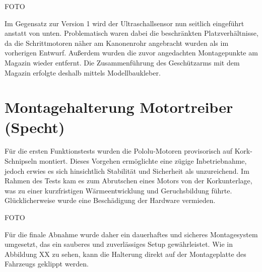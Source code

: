 FOTO

Im Gegensatz zur Version 1 wird der Ultraschallsensor nun seitlich eingeführt anstatt von unten. Problematisch waren dabei die beschränkten Platzverhältnisse, da die Schrittmotoren näher am Kanonenrohr angebracht wurden als im vorherigen Entwurf. Außerdem wurden die zuvor angedachten Montagepunkte am Magazin wieder entfernt. Die Zusammenführung des Geschützarms mit dem Magazin erfolgte deshalb mittels Modellbaukleber.

\section{Montagehalterung Motortreiber (Specht)}

Für die ersten Funktionstests wurden die Pololu-Motoren provisorisch auf Kork-Schnipseln montiert. Dieses Vorgehen ermöglichte eine zügige Inbetriebnahme, jedoch erwies es sich hinsichtlich Stabilität und Sicherheit als unzureichend. Im Rahmen des Tests kam es zum Abrutschen eines Motors von der Korkunterlage, was zu einer kurzfristigen Wärmeentwicklung und Geruchsbildung führte. Glücklicherweise wurde eine Beschädigung der Hardware vermieden.

FOTO

Für die finale Abnahme wurde daher ein dauerhaftes und sicheres Montagesystem umgesetzt, das ein sauberes und zuverlässiges Setup gewährleistet. Wie in Abbildung XX zu sehen, kann die Halterung direkt auf der Montageplatte des Fahrzeugs geklippt werden.